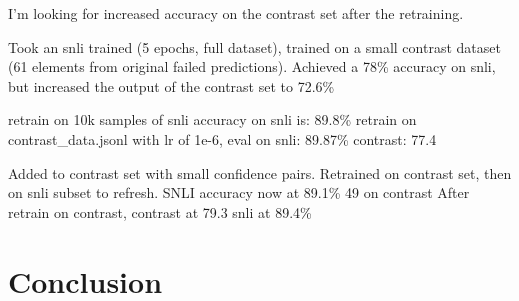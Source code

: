 \documentclass[11pt]{article}
\begin{document}
I'm looking for increased accuracy on the contrast set after the retraining.

Took an snli trained (5 epochs, full dataset), trained on a small contrast dataset (61 elements from original failed predictions).  Achieved a 78\% accuracy on snli, but increased the output of the contrast set to 72.6\%

retrain on 10k samples of snli accuracy on snli is: 89.8\%
retrain on contrast\_data.jsonl with lr of 1e-6, eval on snli: 89.87\%  contrast: 77.4

Added to contrast set with small confidence pairs. Retrained on contrast set, then on snli subset to refresh. SNLI accuracy now at 89.1\% 49 on contrast
After retrain on contrast, contrast at 79.3 snli at 89.4\%

\section{Conclusion}



\end{document}

